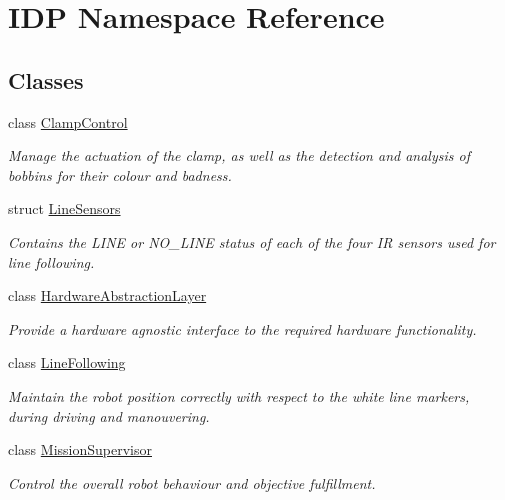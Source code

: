 \hypertarget{namespaceIDP}{
\section{IDP Namespace Reference}
\label{namespaceIDP}
}
\subsection*{Classes}
\begin{DoxyCompactItemize}
\item 
class \hyperlink{classIDP_1_1ClampControl}{ClampControl}
\begin{DoxyCompactList}\small\item\em Manage the actuation of the clamp, as well as the detection and analysis of bobbins for their colour and badness. \item\end{DoxyCompactList}\item 
struct \hyperlink{structIDP_1_1LineSensors}{LineSensors}
\begin{DoxyCompactList}\small\item\em Contains the LINE or NO\_\-LINE status of each of the four IR sensors used for line following. \item\end{DoxyCompactList}\item 
class \hyperlink{classIDP_1_1HardwareAbstractionLayer}{HardwareAbstractionLayer}
\begin{DoxyCompactList}\small\item\em Provide a hardware agnostic interface to the required hardware functionality. \item\end{DoxyCompactList}\item 
class \hyperlink{classIDP_1_1LineFollowing}{LineFollowing}
\begin{DoxyCompactList}\small\item\em Maintain the robot position correctly with respect to the white line markers, during driving and manouvering. \item\end{DoxyCompactList}\item 
class \hyperlink{classIDP_1_1MissionSupervisor}{MissionSupervisor}
\begin{DoxyCompactList}\small\item\em Control the overall robot behaviour and objective fulfillment. \item\end{DoxyCompactList}\item 

\end{DoxyCompactItemize}
